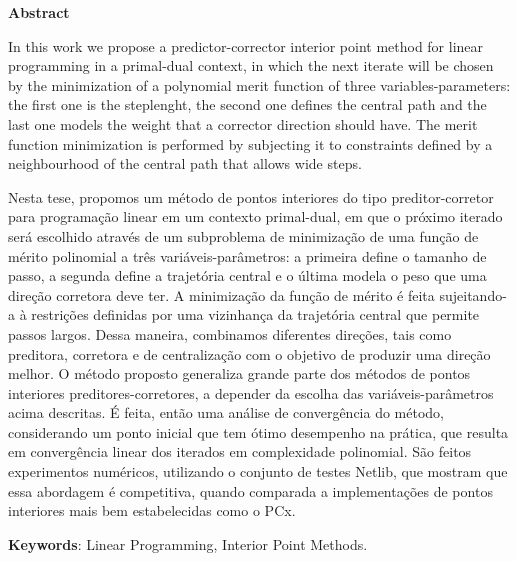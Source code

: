 \begin{center}
  \large{\textbf{Abstract}}
\end{center}




In this work we propose a predictor-corrector interior point method for linear programming in a primal-dual context, in which the next iterate will be chosen by the minimization of a polynomial merit function  of three variables-parameters: the first one is the steplenght, the second one defines the central path and the last one models the weight that a corrector direction should have. The merit function minimization is performed by subjecting it to constraints defined by a neighbourhood of the central path that allows wide steps. 


Nesta tese, propomos um método de pontos interiores do tipo preditor-corretor para programação linear em um contexto primal-dual, em que o próximo iterado será escolhido através de um subproblema de minimização de uma função de mérito polinomial a três variáveis-parâmetros: a primeira  define o tamanho de passo, a segunda define a trajetória central e o última modela o peso que uma direção corretora deve ter. A minimização da função de mérito é feita   sujeitando-a à restrições  definidas por uma vizinhança da trajetória central que permite passos largos. Dessa maneira, combinamos diferentes direções, tais como preditora, corretora e de centralização com o objetivo de produzir uma direção melhor. O método proposto generaliza grande parte dos métodos de pontos interiores preditores-corretores, a depender da escolha das variáveis-parâmetros acima descritas. É feita, então uma análise de convergência do método, considerando um ponto inicial que tem ótimo desempenho na prática, que resulta em convergência linear dos iterados em complexidade polinomial. São feitos experimentos numéricos, utilizando o conjunto de testes Netlib, que mostram que essa abordagem é competitiva, quando comparada a implementações de pontos interiores mais bem estabelecidas como o PCx.



\vspace{.5cm}
\textbf{Keywords}:
Linear Programming, Interior Point Methods.
